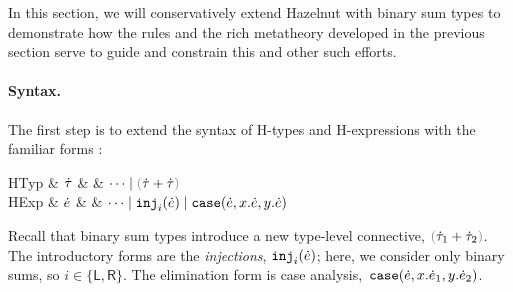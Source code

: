 \renewcommand{\thesumtypedef}{\theequation\alph{sumtypedef}}

\newcommand{\Define}[1]{(\refstepcounter{sumtypedef}\thesumtypedef\label{#1})}

In this section, we will conservatively extend Hazelnut with binary {sum
types} to demonstrate how the rules and the rich metatheory developed in
the previous section serve to guide and constrain this and other such
efforts.

\paragraph{Syntax.}
%
The first step is to extend the syntax of H-types and H-expressions
with the familiar forms \cite{pfpl}:\vspace{-3px}
\begin{grammar}
\textsf{HTyp} & $\dot{\tau}$ & \bnfas & $\cdots \bnfalt \tsum{\htau}{\htau}$
\\
\textsf{HExp} & $\dot{e}$ & \bnfas & $\cdots
\mathrel{\mid} \texttt{inj}_{i}({\dot{e}})
\mathrel{\mid} \texttt{case}({\dot{e}},{x}.{\dot{e}},{y}.{\dot{e}})$
\end{grammar}\vspace{-3px}
Recall that binary sum types introduce a new type-level connective,
$\tsum{\htau_1}{\htau_2}$. The introductory forms are the \emph{injections},
$\texttt{inj}_{i}({\dot{e}})$; here, we consider only binary sums, so $i\in\{\mathsf{L}, \mathsf{R}\}$.
The elimination form is case
analysis,~$\texttt{case}({\dot{e}},{x}.{\dot{e}_1},{y}.{\dot{e}_2})$.

